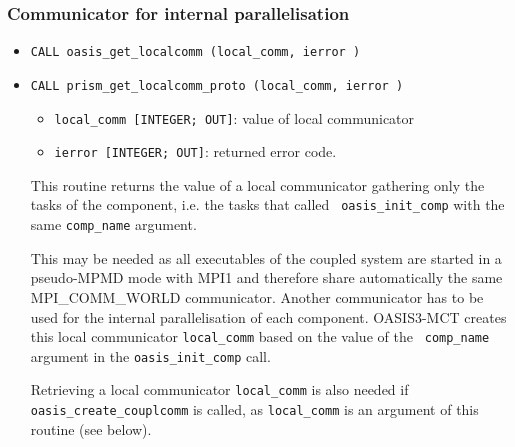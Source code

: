 \subsubsection{Communicator for internal parallelisation}
\label{subsec_MPI1}

\begin{itemize}
\item {\tt CALL oasis\_get\_localcomm (local\_comm, ierror )}
\item {\tt CALL prism\_get\_localcomm\_proto (local\_comm, ierror )}

  \begin{itemize}
  \item {\tt local\_comm [INTEGER; OUT]}: value of local communicator
  \item {\tt ierror [INTEGER; OUT]}: returned error code.
  \end{itemize}

  This routine returns the value of a local communicator gathering
  only the tasks of the component, i.e. the tasks that called {\tt
  oasis\_init\_comp} with the same {\tt comp\_name}
argument.

  This may be needed as all executables of the coupled system are started in a pseudo-MPMD
  mode with MPI1 and therefore share automatically the same MPI\_COMM\_WORLD
  communicator.  Another communicator has to be used for the internal
  parallelisation of each component. OASIS3-MCT creates this local
  communicator {\tt local\_comm} based on the value of the {\tt
    comp\_name} argument in the {\tt oasis\_init\_comp} call.

  Retrieving a local communicator {\tt local\_comm} is also needed if
  {\tt oasis\_create\_couplcomm} is called, as {\tt local\_comm} is an argument of this routine (see below).

\end{itemize}

